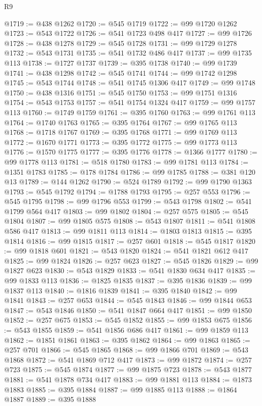 \begin{lexlean}{R9}
\begin{coremodule}
{{{{{{{{{{{{{{{{{{{{{{{{{{{{{{{{{{{{{{{{{{{{{{{{{{{{{{{{{{{{{{{{{{{{{{{{{{{{{{{{{{{{@1719 := @438 @1262
@1720 := @545 @1719
@1722 := @99 @1720 @1262
@1723 := @543 @1722
@1726 := @541 @1723 @498 @417
@1727 := @99 @1726
@1728 := @438 @1278
@1729 := @545 @1728
@1731 := @99 @1729 @1278
@1732 := @543 @1731
@1735 := @541 @1732 @486 @417
@1737 := @99 @1735 @113
@1738 := @1727 @1737
@1739 := @395 @1738
@1740 := @99 @1739
@1741 := @438 @1298
@1742 := @545 @1741
@1744 := @99 @1742 @1298
@1745 := @543 @1744
@1748 := @541 @1745 @1306 @417
@1749 := @99 @1748
@1750 := @438 @1316
@1751 := @545 @1750
@1753 := @99 @1751 @1316
@1754 := @543 @1753
@1757 := @541 @1754 @1324 @417
@1759 := @99 @1757 @113
@1760 := @1749 @1759
@1761 := @395 @1760
@1763 := @99 @1761 @113
@1764 := @1740 @1763
@1765 := @395 @1764
@1767 := @99 @1765 @113
@1768 := @1718 @1767
@1769 := @395 @1768
@1771 := @99 @1769 @113
@1772 := @1670 @1771
@1773 := @395 @1772
@1775 := @99 @1773 @113
@1776 := @1570 @1775
@1777 := @395 @1776
@1778 := @1366 @1777
@1780 := @99 @1778 @113
@1781 := @518 @1780
@1783 := @99 @1781 @113
@1784 := @1351 @1783
@1785 := @178 @1784
@1786 := @99 @1785
@1788 := @381 @120 @13
@1789 := @144 @1262
@1790 := @524 @1789
@1792 := @99 @1790 @1363
@1793 := @545 @1792
@1794 := @1788 @1793
@1795 := @257 @553
@1796 := @545 @1795
@1798 := @99 @1796 @553
@1799 := @543 @1798
@1802 := @541 @1799 @564 @417
@1803 := @99 @1802
@1804 := @257 @575
@1805 := @545 @1804
@1807 := @99 @1805 @575
@1808 := @543 @1807
@1811 := @541 @1808 @586 @417
@1813 := @99 @1811 @113
@1814 := @1803 @1813
@1815 := @395 @1814
@1816 := @99 @1815
@1817 := @257 @601
@1818 := @545 @1817
@1820 := @99 @1818 @601
@1821 := @543 @1820
@1824 := @541 @1821 @612 @417
@1825 := @99 @1824
@1826 := @257 @623
@1827 := @545 @1826
@1829 := @99 @1827 @623
@1830 := @543 @1829
@1833 := @541 @1830 @634 @417
@1835 := @99 @1833 @113
@1836 := @1825 @1835
@1837 := @395 @1836
@1839 := @99 @1837 @113
@1840 := @1816 @1839
@1841 := @395 @1840
@1842 := @99 @1841
@1843 := @257 @653
@1844 := @545 @1843
@1846 := @99 @1844 @653
@1847 := @543 @1846
@1850 := @541 @1847 @664 @417
@1851 := @99 @1850
@1852 := @257 @675
@1853 := @545 @1852
@1855 := @99 @1853 @675
@1856 := @543 @1855
@1859 := @541 @1856 @686 @417
@1861 := @99 @1859 @113
@1862 := @1851 @1861
@1863 := @395 @1862
@1864 := @99 @1863
@1865 := @257 @701
@1866 := @545 @1865
@1868 := @99 @1866 @701
@1869 := @543 @1868
@1872 := @541 @1869 @712 @417
@1873 := @99 @1872
@1874 := @257 @723
@1875 := @545 @1874
@1877 := @99 @1875 @723
@1878 := @543 @1877
@1881 := @541 @1878 @734 @417
@1883 := @99 @1881 @113
@1884 := @1873 @1883
@1885 := @395 @1884
@1887 := @99 @1885 @113
@1888 := @1864 @1887
@1889 := @395 @1888
}}}}}}}}}}}}}}}}}}}}}}}}}}}}}}}}}}}}}}}}}}}}}}}}}}}}}}}}}}}}}}}}}}}}}}}}}}}}}}}}}}}}
\end{coremodule}
\end{lexlean}

